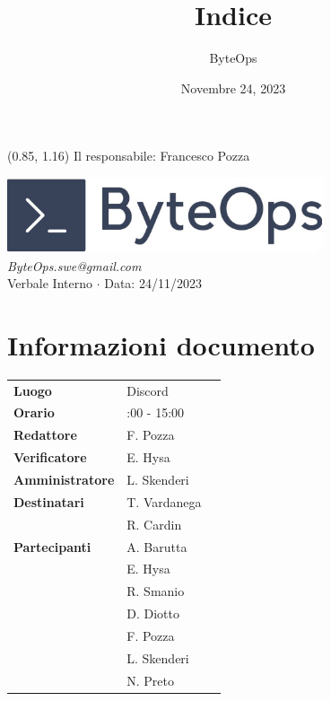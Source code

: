 \documentclass{article}
\title{\textbf{\fontsize{28}{6}\selectfont Indice}}
\author{\fontsize{14}{6}\selectfont ByteOps}
\date{Novembre 24, 2023}
\begin{document}
\begin{textblock*}{\textwidth}(0.85\textwidth, 1.16\textheight)
    Il responsabile: Francesco Pozza
\end{textblock*}


\pagestyle{fancy}
\begin{center}
\includegraphics[width = 0.7\textwidth]{../../../Images/logo.png} \\
\vspace{0.2cm}
\textcolor[RGB]{60, 60, 60}{\textit{ByteOps.swe@gmail.com}} \\
\vspace{1cm}
\fontsize{16}{6}\selectfont Verbale Interno $\cdot$ Data: 24/11/2023 \\
\vspace{0.5cm}
\end{center}

\section*{Informazioni documento}
\def\arraystretch{1.2}
\begin{tabular}{>{\raggedleft\arraybackslash}p{}|>{\raggedright\arraybackslash}p{}c}
\hline
\addlinespace
\textbf{Luogo} & Discord \vspace{10pt} \\
\textbf{Orario} &  14:00 - 15:00  \vspace{10pt} \\
\textbf{Redattore} & F. Pozza \vspace{10pt} \\
\textbf{Verificatore} & E. Hysa \vspace{10pt} \\
\textbf{Amministratore} & L. Skenderi \vspace{10pt} \\
\textbf{Destinatari} & T. Vardanega \\ & R. Cardin \vspace{10pt} \\
\textbf{Partecipanti} & A. Barutta \\ & E. Hysa \\ & R. Smanio \\ & D. Diotto \\ & F. Pozza \\ & L. Skenderi \\ & N. Preto \vspace{10pt} \\
\end{tabular}
\pagebreak 
\end{document}
